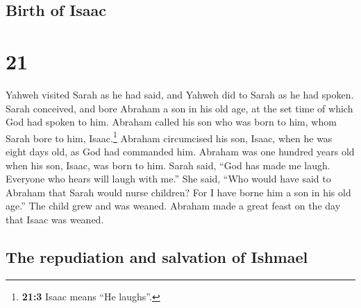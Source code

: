 \hypertarget{birth-of-isaac}{%
\subsection{Birth of Isaac}\label{birth-of-isaac}}

\hypertarget{section-20}{%
\section{21}\label{section-20}}

 Yahweh visited Sarah as he had said, and Yahweh did to
Sarah as he had spoken.  Sarah conceived, and bore Abraham
a son in his old age, at the set time of which God had spoken to him.
 Abraham called his son who was born to him, whom Sarah
bore to him, Isaac.\footnote{\textbf{21:3} Isaac means ``He laughs''.}
 Abraham circumcised his son, Isaac, when he was eight
days old, as God had commanded him.  Abraham was one
hundred years old when his son, Isaac, was born to him. 
Sarah said, ``God has made me laugh. Everyone who hears will laugh with
me.''  She said, ``Who would have said to Abraham that
Sarah would nurse children? For I have borne him a son in his old age.''
 The child grew and was weaned. Abraham made a great feast
on the day that Isaac was weaned.

\hypertarget{the-repudiation-and-salvation-of-ishmael}{%
\subsection{The repudiation and salvation of
Ishmael}\label{the-repudiation-and-salvation-of-ishmael}}


